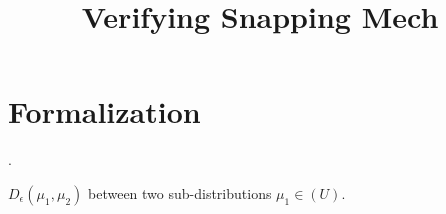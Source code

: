 \documentclass{article}
\begin{document}
\title{Verifying Snapping Mech}

\maketitle

\section{Formalization}
\begin{defn}
.

$D_{\epsilon}(\mu_1, \mu_2)$ between two sub-distributions $\mu_1 \in (U)$.
\end{defn}
\end{document}
